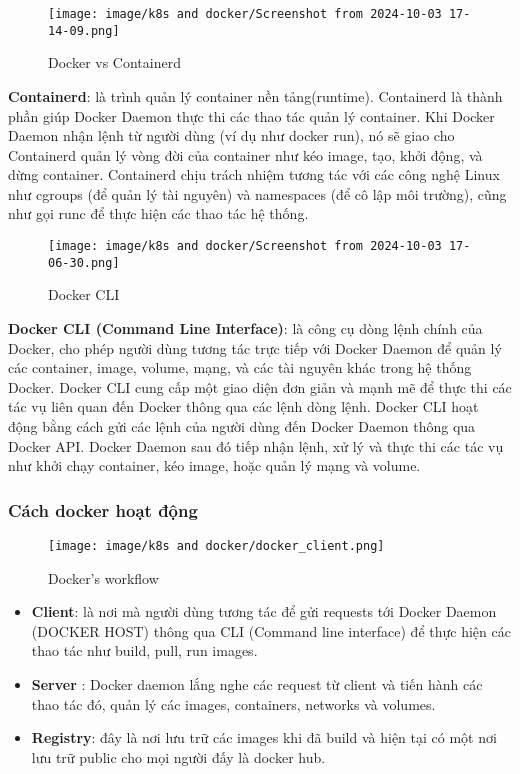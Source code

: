 \documentclass[a4paper,12pt]{article}
\begin{document}
\begin{figure}[htbp]
    \centering
    \texttt{[image: image/k8s and docker/Screenshot from 2024-10-03 17-14-09.png]}
    \caption{Docker vs Containerd}
    \label{}
\end{figure}

\textbf{Containerd}: là trình quản lý container nền tảng(runtime). Containerd là thành phần giúp Docker Daemon thực thi các thao tác quản lý container. Khi Docker Daemon nhận lệnh từ người dùng (ví dụ như docker run), nó sẽ giao cho Containerd quản lý vòng đời của container như kéo image, tạo, khởi động, và dừng container. Containerd chịu trách nhiệm tương tác với các công nghệ Linux như cgroups (để quản lý tài nguyên) và namespaces (để cô lập môi trường), cũng như gọi runc để thực hiện các thao tác hệ thống.\\



\begin{figure}[htbp]
    \centering
    \texttt{[image: image/k8s and docker/Screenshot from 2024-10-03 17-06-30.png]}
    \caption{Docker CLI}
    \label{}
\end{figure}

\textbf{Docker CLI (Command Line Interface)}: là công cụ dòng lệnh chính của Docker, cho phép người dùng tương tác trực tiếp với Docker Daemon để quản lý các container, image, volume, mạng, và các tài nguyên khác trong hệ thống Docker. Docker CLI cung cấp một giao diện đơn giản và mạnh mẽ để thực thi các tác vụ liên quan đến Docker thông qua các lệnh dòng lệnh. Docker CLI hoạt động bằng cách gửi các lệnh của người dùng đến Docker Daemon thông qua Docker API. Docker Daemon sau đó tiếp nhận lệnh, xử lý và thực thi các tác vụ như khởi chạy container, kéo image, hoặc quản lý mạng và volume.



\subsubsection{ Cách docker hoạt động}


\begin{figure}[htbp]
    \centering
    \texttt{[image: image/k8s and docker/docker\_client.png]}
    \caption{Docker's  workflow}
    \label{}
\end{figure}

\begin{itemize}
    \item \textbf{Client}: là nơi mà người dùng tương tác để gửi requests tới Docker Daemon (DOCKER HOST) thông qua CLI (Command line interface) để thực hiện các thao tác như build, pull, run images.
    \item \textbf{Server} : Docker daemon lắng nghe các request từ client và tiến hành các thao tác đó, quản lý các images, containers, networks và volumes.
    \item \textbf{Registry}: đây là nơi lưu trữ các images khi đã build và hiện tại có một nơi lưu trữ public cho mọi người đấy là docker hub.
\end{itemize}
\end{document}
